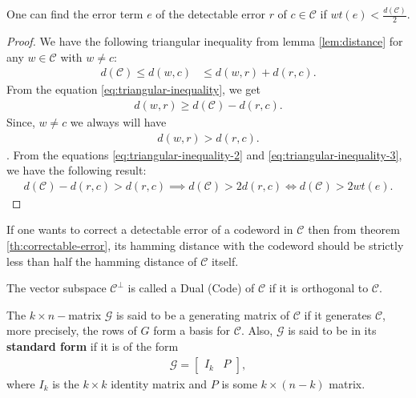 \begin{theorem}\cite{../gallian2024contemporary}\label{th:correctable-error}
  One can find the error term $e$ of the detectable error $r$ of $c\in\mathcal{C}$ if 
  $wt(e)<\frac{d(\mathcal{C})}{2}$.
\end{theorem}
\begin{proof}
  We have the following triangular inequality from lemma \ref{lem:distance} for any $w\in\mathcal{C}$ with 
  $w\neq c$:
  \begin{align}\label{eq:triangular-inequality}
    d(\mathcal{C})\leq d(w,c)&\leq d(w,r)+d(r,c).
  \end{align}
  From the equation \eqref{eq:triangular-inequality}, we get 
  \begin{align}\label{eq:triangular-inequality-2}
    d(w,r)\geq d(\mathcal{C})-d(r,c).
  \end{align} 
  Since, $w\neq c$ we always will have 
  \begin{align}\label{eq:triangular-inequality-3}
    d(w,r)>d(r,c).
  \end{align}. 
  From the equations \eqref{eq:triangular-inequality-2} and \eqref{eq:triangular-inequality-3}, we have the 
  following result:
  \begin{align*}
    d(\mathcal{C})-d(r,c)>d(r,c) \implies d(\mathcal{C})>2d(r,c) \iff d(\mathcal{C})>2wt(e).
  \end{align*}
\end{proof}

If one wants to correct a detectable error of a codeword in $\mathcal{C}$ then from theorem 
\ref{th:correctable-error}, its hamming distance with the codeword should be strictly less than half 
the hamming distance of $\mathcal{C}$ itself.

\begin{definition}
  The vector subspace $\mathcal{C}^{\perp}$ is called a Dual (Code) of $\mathcal{C}$ if it is 
  orthogonal to $\mathcal{C}$.
\end{definition}

\begin{definition}
  The $k\times n-$matrix $\mathcal{G}$ is said to be a generating matrix of $\mathcal{C}$ if it 
  generates $\mathcal{C}$, more precisely, the rows of $G$ form a basis for $\mathcal{C}$. Also, $\mathcal{G}$ is said to be in its 
  \textbf{standard form} if it is of the form
  \begin{align*}
    \mathcal{G} = \begin{bmatrix}
      I_k & P
    \end{bmatrix},
  \end{align*}
  where $I_k$ is the $k\times k$ identity matrix and $P$ is some $k\times (n-k)$ matrix.
\end{definition}

